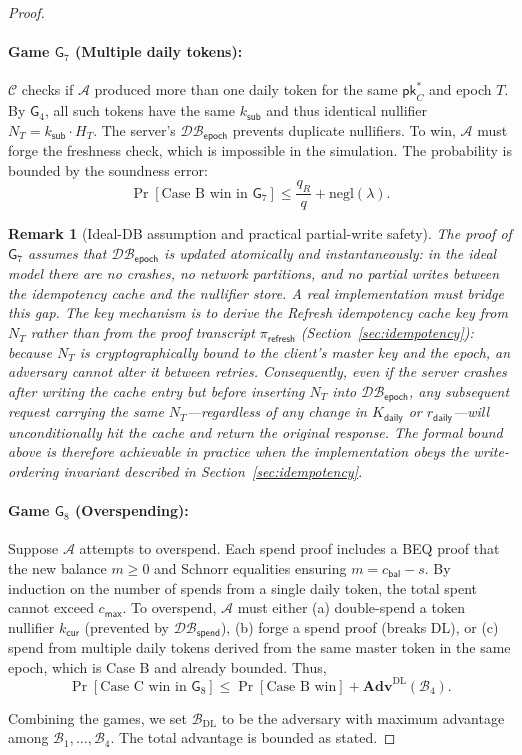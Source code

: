 \documentclass[11pt]{article}
\theoremstyle{definitionstyle}
\theoremstyle{plain}
\newtheorem*{remark}{Remark}
\newcommand{\advantage}[1]{\mathbf{Adv}^{\mathrm{#1}}}
\newcommand{\negl}{\mathrm{negl}}
\newcommand{\DB}{\mathcal{DB}}
\begin{document}
\begin{proof}
\paragraph{Game $\mathsf{G}_7$ (Multiple daily tokens):} $\mathcal{C}$ checks if $\mathcal{A}$ produced more than one daily token for the same $\mathsf{pk}_C^*$ and epoch $T$. By $\mathsf{G}_4$, all such tokens have the same $k_{\mathsf{sub}}$ and thus identical nullifier $N_T = k_{\mathsf{sub}} \cdot H_T$. The server's $\DB_{\mathsf{epoch}}$ prevents duplicate nullifiers. To win, $\mathcal{A}$ must forge the freshness check, which is impossible in the simulation. The probability is bounded by the soundness error:
\[
\Pr[\text{Case B win in }\mathsf{G}_7] \le \frac{q_R}{q} + \negl(\lambda).
\]

\begin{remark}[Ideal-DB assumption and practical partial-write safety]
The proof of $\mathsf{G}_7$ assumes that $\DB_{\mathsf{epoch}}$ is updated \emph{atomically and instantaneously}: in the ideal model there are no crashes, no network partitions, and no partial writes between the idempotency cache and the nullifier store.  A real implementation must bridge this gap.  The key mechanism is to derive the Refresh idempotency cache key from $N_T$ rather than from the proof transcript $\pi_{\mathsf{refresh}}$ (Section~\ref{sec:idempotency}): because $N_T$ is cryptographically bound to the client's master key and the epoch, an adversary cannot alter it between retries.  Consequently, even if the server crashes after writing the cache entry but before inserting $N_T$ into $\DB_{\mathsf{epoch}}$, any subsequent request carrying the same $N_T$---regardless of any change in $K_{\mathsf{daily}}$ or $r_{\mathsf{daily}}$---will unconditionally hit the cache and return the original response.  The formal bound above is therefore achievable in practice when the implementation obeys the write-ordering invariant described in Section~\ref{sec:idempotency}.
\end{remark}

\paragraph{Game $\mathsf{G}_8$ (Overspending):} Suppose $\mathcal{A}$ attempts to overspend. Each spend proof includes a BEQ proof that the new balance $m \ge 0$ and Schnorr equalities ensuring $m = c_{\mathsf{bal}} - s$. By induction on the number of spends from a single daily token, the total spent cannot exceed $c_{\mathsf{max}}$. To overspend, $\mathcal{A}$ must either (a) double-spend a token nullifier $k_{\mathsf{cur}}$ (prevented by $\DB_{\mathsf{spend}}$), (b) forge a spend proof (breaks DL), or (c) spend from multiple daily tokens derived from the same master token in the same epoch, which is Case B and already bounded. Thus,
\[
\Pr[\text{Case C win in }\mathsf{G}_8] \le \Pr[\text{Case B win}] + \advantage{DL}(\mathcal{B}_4).
\]

Combining the games, we set $\mathcal{B}_{\text{DL}}$ to be the adversary with maximum advantage among $\mathcal{B}_1,\dots,\mathcal{B}_4$. The total advantage is bounded as stated.
\end{proof}
\end{document}
